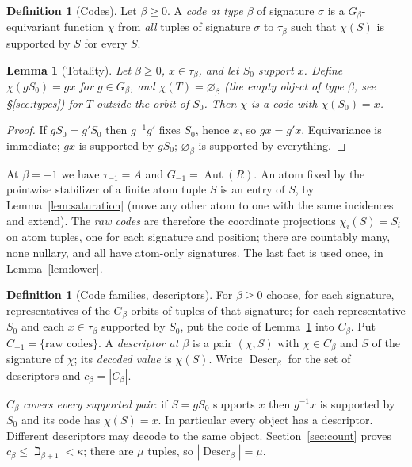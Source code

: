 \documentclass[11pt]{article}
\newtheorem{lemma}[theorem]{Lemma}
\theoremstyle{definition}
\newtheorem{definition}[theorem]{Definition}
\theoremstyle{remark}
\newcommand{\Aut}{\operatorname{Aut}}
\newcommand{\Descr}{\operatorname{Descr}}
\begin{document}
\begin{definition}[Codes]
Let \(\beta\geq0\). A \emph{code at type \(\beta\)} of signature
\(\sigma\) is a \(G_\beta\)-equivariant function \(\chi\) from \emph{all}
tuples of signature \(\sigma\) to \(\tau_\beta\) such that \(\chi(S)\) is
supported by \(S\) for every \(S\).
\end{definition}

\begin{lemma}[Totality]\label{lem:total}
Let \(\beta\geq0\), \(x\in\tau_\beta\), and let \(S_0\) support \(x\).
Define \(\chi(gS_0)=gx\) for \(g\in G_\beta\), and \(\chi(T)=
\varnothing_\beta\) (the empty object of type \(\beta\), see
\S\ref{sec:types}) for \(T\) outside the orbit of \(S_0\). Then \(\chi\)
is a code with \(\chi(S_0)=x\).
\end{lemma}
\begin{proof}
If \(gS_0=g'S_0\) then \(g^{-1}g'\) fixes \(S_0\), hence \(x\), so
\(gx=g'x\). Equivariance is immediate; \(gx\) is supported by \(gS_0\);
\(\varnothing_\beta\) is supported by everything.
\end{proof}

At \(\beta=-1\) we have \(\tau_{-1}=A\) and \(G_{-1}=\Aut(R)\). An atom
fixed by the pointwise stabilizer of a finite atom tuple \(S\) is an entry
of \(S\), by Lemma~\ref{lem:saturation} (move any other atom to one with
the same incidences and extend). The \emph{raw codes} are therefore the
coordinate projections \(\chi_i(S)=S_i\) on atom tuples, one for each
signature and position; there are countably many, none nullary, and all
have atom-only signatures. The last fact is used once, in
Lemma~\ref{lem:lower}.

\begin{definition}[Code families, descriptors]
For \(\beta\geq0\) choose, for each signature, representatives of the
\(G_\beta\)-orbits of tuples of that signature; for each representative
\(S_0\) and each \(x\in\tau_\beta\) supported by \(S_0\), put the code of
Lemma~\ref{lem:total} into \(C_\beta\). Put \(C_{-1}=\{\text{raw codes}\}
\). A \emph{descriptor at \(\beta\)} is a pair \((\chi,S)\) with \(\chi\in
C_\beta\) and \(S\) of the signature of \(\chi\); its \emph{decoded value}
is \(\chi(S)\). Write \(\Descr_\beta\) for the set of descriptors and
\(c_\beta=|C_\beta|\).
\end{definition}

\(C_\beta\) \emph{covers every supported pair}: if \(S=gS_0\) supports
\(x\) then \(g^{-1}x\) is supported by \(S_0\) and its code has
\(\chi(S)=x\). In particular every object has a descriptor. Different
descriptors may decode to the same object. Section~\ref{sec:count} proves
\(c_\beta\leq\beth_{\beta+1}<\kappa\); there are \(\mu\) tuples, so
\(|\Descr_\beta|=\mu\).
\end{document}
